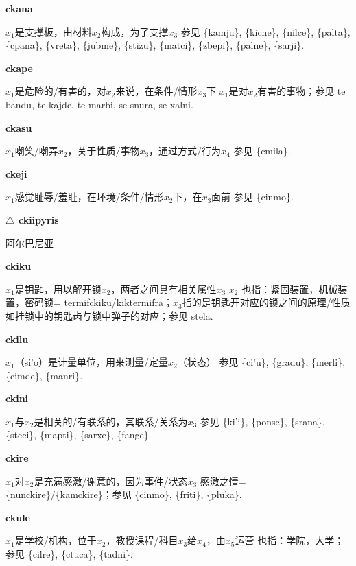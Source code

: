 \documentclass[notitlepage,twocolumn,a4paper,10pt]{book}
\begin{document}
{\sffamily\bfseries ckana}\enspace {\ttfamily\bfseries[    cka]}  $x_1$是支撑板，由材料$x_2$构成，为了支撑$x_3$ \textemdash{} 参见 \{kamju\}, \{kicne\}, \{nilce\}, \{palta\}, \{cpana\}, \{vreta\}, \{jubme\}, \{stizu\}, \{matci\}, \{zbepi\}, \{palne\}, \{sarji\}.

{\sffamily\bfseries ckape}\enspace {\ttfamily\bfseries[cap]}  $x_1$是危险的\slash{}有害的，对$x_2$来说，在条件\slash{}情形$x_3$下 \textemdash{} $x_1$是对$x_2$有害的事物；参见 te {bandu}, te {kajde}, te {marbi}, se {snura}, se {xalni}.

{\sffamily\bfseries ckasu}\enspace {\ttfamily\bfseries[cas]}  $x_1$嘲笑\slash{}嘲弄$x_2$，关于性质\slash{}事物$x_3$，通过方式\slash{}行为$x_4$ \textemdash{} 参见 \{cmila\}.

{\sffamily\bfseries ckeji}  $x_1$感觉耻辱\slash{}羞耻，在环境\slash{}条件\slash{}情形$x_2$下，在$x_3$面前 \textemdash{} 参见 \{cinmo\}.

{\sffamily\bfseries $\triangle$ ckiipyris} 阿尔巴尼亚

{\sffamily\bfseries ckiku}\enspace {\ttfamily\bfseries[kik]}  $x_1$是钥匙，用以解开锁$x_2$，两者之间具有相关属性$x_3$ \textemdash{} $x_2$ 也指：紧固装置，机械装置，密码锁= {termifckiku}\slash{}{kiktermifra}；$x_3$指的是钥匙开对应的锁之间的原理\slash{}性质如挂锁中的钥匙齿与锁中弹子的对应；参见 {stela}.

{\sffamily\bfseries ckilu}\enspace {\ttfamily\bfseries[        ci'u]}  $x_1$（si'o）是计量单位，用来测量\slash{}定量$x_2$（状态） \textemdash{} 参见 \{ci'u\}, \{gradu\}, \{merli\}, \{cimde\}, \{manri\}.

{\sffamily\bfseries ckini}\enspace {\ttfamily\bfseries[        ki'i]}  $x_1$与$x_2$是相关的\slash{}有联系的，其联系\slash{}关系为$x_3$ \textemdash{} 参见 \{ki'i\}, \{ponse\}, \{srana\}, \{steci\}, \{mapti\}, \{sarxe\}, \{fange\}.

{\sffamily\bfseries ckire}\enspace {\ttfamily\bfseries[kir]}  $x_1$对$x_2$是充满感激\slash{}谢意的，因为事件\slash{}状态$x_3$ \textemdash{} 感激之情= \{nunckire\}\slash{}\{kamckire\}；参见 \{cinmo\}, \{friti\}, \{pluka\}.

{\sffamily\bfseries ckule}\enspace {\ttfamily\bfseries[kul     cu'e]}  $x_1$是学校\slash{}机构，位于$x_2$，教授课程\slash{}科目$x_3$给$x_4$，由$x_5$运营 \textemdash{} 也指：学院，大学；参见 \{cilre\}, \{ctuca\}, \{tadni\}.
\end{document}
